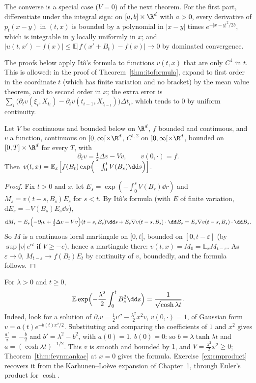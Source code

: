 The converse is a special case ($V=0$) of the next theorem. For the first part, differentiate under the integral sign: on $[a,b]\times\R^d$ with $a>0$, every derivative of $p_t(x-y)$ in $(t,x)$ is bounded by a
polynomial in $|x-y|$ times $e^{-|x-y|^2/2b}$, which is integrable in $y$ locally uniformly in $x$; and $|u(t,x')-f(x)|\le\mathbb E|f(x'+B_t)-f(x)|\to0$ by dominated convergence.

The proofs below apply It\^o's formula to functions $v(t,x)$ that are only $C^1$ in $t$. This is allowed: in the proof of Theorem~\ref{thm:itoformula}, expand to first order in the coordinate $t$ (which has finite
variation and no bracket) by the mean value theorem, and to second order in $x$; the extra error is $\sum_i\bigl(\partial_tv(\xi_i,X_{t_i})-\partial_tv(t_{i-1},X_{t_{i-1}})\bigr)\Delta t_i$, which tends to $0$ by uniform continuity.

\begin{theorem}\label{thm:feynmankac}
Let $V$ be continuous and bounded below on $\R^d$, $f$ bounded and continuous, and $v$ a function, continuous on $[0,\infty[\times\R^d$, $C^{1,2}$ on $]0,\infty[\times\R^d$, bounded on $[0,T]\times\R^d$ for every $T$, with
\[
\partial_tv=\tfrac12\Delta v-Vv,\qquad v(0,\cdot)=f.
\]
Then $v(t,x)=\mathbb E_x\Bigl[f(B_t)\exp\Bigl(-\int_0^tV(B_s)\dd s\Bigr)\Bigr]$.
\end{theorem}

\begin{proof}
Fix $t>0$ and $x$, let $E_s=\exp(-\int_0^sV(B_r)\dd r)$ and $M_s=v(t-s,B_s)E_s$ for $s<t$. By It\^o's formula (with $E$ of finite variation, $\mathrm dE_s=-V(B_s)E_s\dd s$),
\[
\mathrm dM_s=E_s\Bigl(-\partial_tv+\tfrac12\Delta v-Vv\Bigr)(t-s,B_s)\dd s+E_s\nabla v(t-s,B_s)\cdot\dd B_s=E_s\nabla v(t-s,B_s)\cdot\dd B_s.
\]
So $M$ is a continuous local martingale on $[0,t[$, bounded on $[0,t-\varepsilon]$ (by $\sup|v|\,e^{ct}$ if $V\ge-c$), hence a martingale there: $v(t,x)=M_0=\mathbb E_xM_{t-\varepsilon}$. As $\varepsilon\to0$, $M_{t-\varepsilon}\to f(B_t)E_t$
by continuity of $v$, boundedly, and the formula follows.
\end{proof}

\begin{example}\label{ex:cmcosh}
For $\lambda>0$ and $t\ge0$,
\[
\mathbb E\exp\Bigl(-\frac{\lambda^2}2\int_0^tB_s^2\dd s\Bigr)=\frac1{\sqrt{\cosh\lambda t}}.
\]
Indeed, look for a solution of $\partial_tv=\frac12v''-\frac{\lambda^2}2x^2v$, $v(0,\cdot)=1$, of Gaussian form $v=a(t)e^{-b(t)x^2/2}$. Substituting and comparing the coefficients of $1$ and $x^2$ gives $\frac{a'}a=-\frac b2$ and
$b'=\lambda^2-b^2$, with $a(0)=1$, $b(0)=0$: so $b=\lambda\tanh\lambda t$ and $a=(\cosh\lambda t)^{-1/2}$. This $v$ is smooth and bounded by $1$, and $V=\frac{\lambda^2}2x^2\ge0$; Theorem~\ref{thm:feynmankac} at $x=0$ gives the
formula. Exercise~\ref{ex:cmproduct} recovers it from the Karhunen--Lo\`eve expansion of Chapter~1, through Euler's product for $\cosh$.
\end{example}


